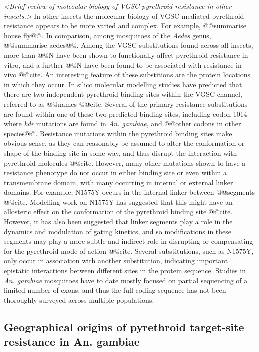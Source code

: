 \documentclass[a4paper,11pt,abstracton,hidelinks]{scrartcl}
\begin{document}
\textit{<Brief review of molecular biology of VGSC pyrethroid resistance in other insects.>}
%
In other insects the molecular biology of VGSC-mediated pyrethroid resistance appears to be more varied and complex.
%
For example, @@summarise house fly@@.
%
In comparison, among mosquitoes of the \textit{Aedes} genus, @@summarise aedes@@.
%
Among the VGSC substitutions found across all insects, more than @@N have been shown to functionally affect pyrethroid resistance in vitro, and a further @@N have been found to be associated with resistance in vivo @@cite.
%
An interesting feature of these substitions are the protein locations in which they occur.
%
In silico molecular modelling studies have predicted that there are two independent pyrethroid binding sites within the VGSC channel, referred to as @@names @@cite.
%
Several of the primary resistance substitutions are found within one of these two predicted binding sites, including codon 1014 where \textit{kdr} mutations are found in \textit{An. gambiae}, and @@other codons in other species@@.
%
Resistance mutations within the pyrethroid binding sites make obvious sense, as they can reasonably be assumed to alter the conformation or shape of the binding site in some way, and thus disrupt the interaction with pyrethroid molecules @@cite.
%
However, many other mutations shown to have a resistance phenotype do not occur in either binding site or even within a transmembrane domain, with many occurring in internal or external linker domains.
%
For example, N1575Y occurs in the internal linker between @@segments @@cite.
%
Modelling work on N1575Y has suggested that this might have an allosteric effect on the conformation of the pyrethroid binding site @@cite.
%
However, it has also been suggested that linker segments play a role in the dynamics and modulation of gating kinetics, and so modifications in these segments may play a more subtle and indirect role in disrupting or compensating for the pyrethroid mode of action @@cite.
%
Several substitutions, such as N1575Y, only occur in association with another substitution, indicating important epistatic interactions between different sites in the protein sequence.
%
Studies in \textit{An. gambiae} mosquitoes have to date mostly focused on partial sequencing of a limited number of exons, and thus the full coding sequence has not been thoroughly surveyed across multiple populations.


\subsection*{Geographical origins of pyrethroid target-site resistance in An. gambiae}
\end{document}
